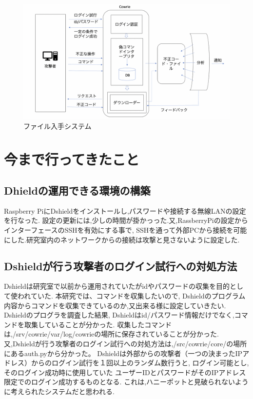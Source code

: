 \documentclass{entry}
\begin{document}
\begin{figure}[htbp]
	\centering
 	\includegraphics[width=\hsize]{hpsystem.png}
 	\caption{ファイル入手システム}
\end{figure}


\section{今まで行ってきたこと}
\subsection{Dhieldの運用できる環境の構築}
Raspberry PiにDshieldをインストールし,パスワードや接続する無線LANの設定を行なった.
設定の更新には,少しの時間が掛かっった.又,RassberryPiの設定からインターフェースのSSHを有効にする事で,
SSHを通って外部PCから接続を可能にした.研究室内のネットワークからの接続は攻撃と見さないように設定した.
\subsection{Dshieldが行う攻撃者のログイン試行への対処方法}
Dshieldは研究室で以前から運用されていたがidやパスワードの収集を目的として使われていた.
本研究では、コマンドを収集したいので,
Dshieldのプログラム内容からコマンドを収集できているのか,又出来る様に設定していきたい.
Dshieldのプログラを調査した結果,
Dshieldはid/パスワード情報だけでなく,コマンドを取集していることが分かった.
収集したコマンドは,/srv/cowrie/var/log/cowrieの場所に保存されていることが分かった.
又,Dshieldが行う攻撃者のログイン試行への対処方法は,/src/cowrie/core/の場所にあるauth.pyから分かった。
Dshieldは外部からの攻撃者（一つの決まったIPアドレス）からのログイン試行を１回以上のランダム数行うと,
ログイン可能とし,そのログイン成功時に使用していた
ユーザーIDとパスワードがそのIPアドレス限定でのログイン成功するものとなる.
これは,ハニーポットと見破られないように考えられたシステムだと思われる.
\end{document}
